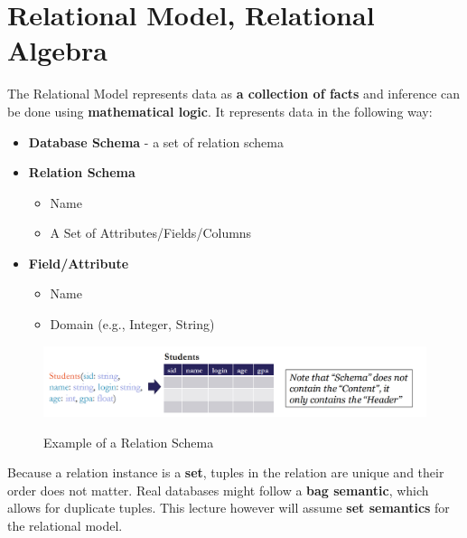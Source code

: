 \section{Relational Model, Relational Algebra}
The Relational Model represents data as \textbf{a collection of facts} and inference can be done using \textbf{mathematical logic}. It represents data in the following way:
\begin{itemize}
\item \textbf{Database Schema} - a set of relation schema
\item \textbf{Relation Schema} \begin{itemize}
\item Name
\item A Set of Attributes/Fields/Columns
\end{itemize}
\item \textbf{Field/Attribute} \begin{itemize}
\item Name
\item Domain (e.g., Integer, String)
\end{itemize}
\end{itemize}
\begin{figure}[H]
\centering
\includegraphics[width=.9\textwidth]{images/schema.PNG}
\label{Relational_Model_schema}
\caption{Example of a Relation Schema}
\end{figure}
Because a relation instance is a \textbf{set}, tuples in the relation are unique and their order does not matter. Real databases might follow a \textbf{bag semantic}, which allows for duplicate tuples. This lecture however will assume \textbf{set semantics} for the relational model.

